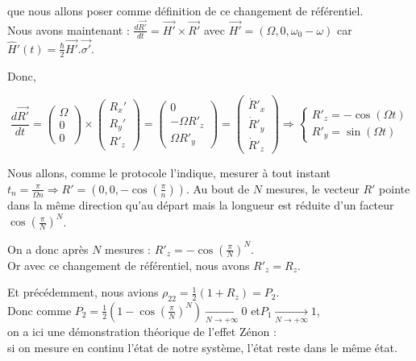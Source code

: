 \documentclass[11pt]{article}
\begin{document}
que nous allons poser comme définition de ce changement de référentiel.\\
\vspace{0.3cm}
Nous avons maintenant : $\frac{d\Vec{R'}}{dt} = \Vec{H'}\times \Vec{R'}$ avec $\Vec{H'} = (\Omega, 0, \omega_0 - \omega)$ car $\hat H'(t) = \frac{\hbar}{2} \Vec{H'}.\Vec{\sigma'}$.

\vspace{0.5cm}

Donc,

\[
\frac{d\Vec{R'}}{dt} = \begin{pmatrix}
    \Omega \\ 0\\0
\end{pmatrix} \times \begin{pmatrix}
    R_x' \\ R_y'\\R'_z
\end{pmatrix} = \begin{pmatrix}
    0 \\ -\Omega R'_z\\ \Omega R'_y
\end{pmatrix} = \begin{pmatrix}
    \dot{R}'_x \\ \dot{R}'_y\\\dot{R}'_z
\end{pmatrix}
\Rightarrow
\begin{cases}
    R'_z = -\cos(\Omega t)\\
    R'_y = \sin(\Omega t)
\end{cases}
\]

Nous allons, comme le protocole l'indique, mesurer à tout instant $t_n = \frac{\pi}{\Omega n} \Rightarrow R' = (0, 0, -\cos(\frac{\pi}{n}))$. Au bout de $N$ mesures, le vecteur $R'$ pointe dans la même direction qu'au départ mais la longueur est réduite d'un facteur $\cos(\frac{\pi}{N})^N$.

\vspace{0.5cm}

On a donc après $N$ mesures : $R'_z = -\cos(\frac{\pi}{N})^N$.\\
\vspace{0.3Cm}
Or avec ce changement de référentiel, nous avons $R'_z = R_z$.

\vspace{0.3cm}

Et précédemment, nous avions $\rho_{22} = \frac{1}{2} (1 + R_z) = P_2$. \\
\vspace{0.2cm}
Donc comme \qquad $P_2 = \frac{1}{2} (1 -\cos(\frac{\pi}{N})^N) \xrightarrow[N \rightarrow +\infty]{} 0$ \qquad et\qquad $P_1 \xrightarrow[N \rightarrow +\infty]{} 1$, \\
\vspace{0.3cm}
on a ici une démonstration théorique de l'effet Zénon :\\
si on mesure en continu l'état de notre système, l'état reste dans le même état.
\end{document}
